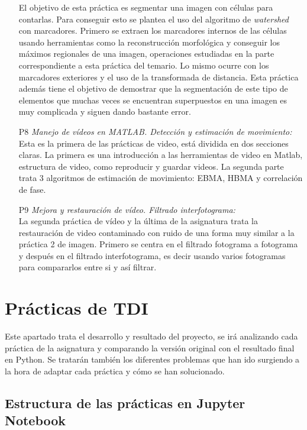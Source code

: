 \begin{itemize}
	El objetivo de esta práctica es segmentar una imagen con células para contarlas. Para conseguir esto se plantea el uso del algoritmo de \emph{watershed} con marcadores. Primero se extraen los marcadores internos de las células usando herramientas como la reconstrucción morfológica y conseguir los máximos regionales de una imagen, operaciones estudiadas en la parte correspondiente a esta práctica del temario. Lo mismo ocurre con los marcadores exteriores y el uso de la transformada de distancia. Esta práctica además tiene el objetivo de demostrar que la segmentación de este tipo de elementos que muchas veces se encuentran superpuestos en una imagen es muy complicada y siguen dando bastante error.
  \item [P8]\emph{Manejo de vídeos en MATLAB. Detección y estimación de movimiento:}\\
	Esta es la primera de las prácticas de video, está dividida en dos secciones claras. La primera es una introducción a las herramientas de video en Matlab, estructura de video, como reproducir y guardar videos. La segunda parte trata 3 algoritmos de estimación de movimiento: EBMA, HBMA y correlación de fase.
  \item [P9]\emph{Mejora y restauración de vídeo. Filtrado interfotograma:}\\
	La segunda práctica de vídeo y la última de la asignatura trata la restauración de video contaminado con ruido de una forma muy similar a la práctica 2 de imagen. Primero se centra en el filtrado fotograma a fotograma y después en el filtrado interfotograma, es decir usando varios fotogramas para compararlos entre si y así filtrar.
\end{itemize}


\chapter{Prácticas de TDI}

Este apartado trata el desarrollo y resultado del proyecto, se irá analizando cada práctica de la asignatura y comparando la versión original con el resultado final en Python. Se tratarán también los diferentes problemas que han ido surgiendo a la hora de adaptar cada práctica y cómo se han solucionado.\\

\section{Estructura de las prácticas en Jupyter Notebook}

